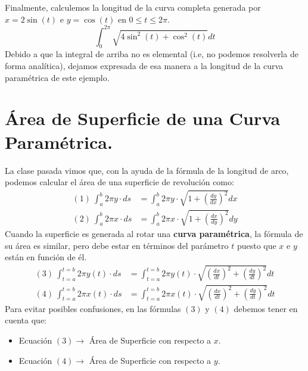 \documentclass[12pt]{article}
\begin{document}
Finalmente, calculemos la longitud de la curva completa generada por $x = 2 \sin(t)$ e $y = \cos(t)$ en $0 \leq t \leq 2\pi$.
\[
  \int_{0}^{2\pi} \sqrt{4\sin^{2}(t) + \cos^{2}(t)} dt
\]
Debido a que la integral de arriba no es elemental (i.e, no podemos resolverla de forma analítica), dejamos expresada de esa manera a la longitud de la curva paramétrica de este ejemplo.


\section{Área de Superficie de una Curva Paramétrica.}

La clase pasada vimos que, con la ayuda de la fórmula de la longitud de arco, podemos calcular el área de una superficie de revolución como:
\begin{align*}
  (1) \ \int_{a}^{b} 2 \pi y \cdot ds &= \int_{a}^{b} 2 \pi y \cdot \sqrt{1 + \left(\frac{dy}{dx}\right)^{2}} dx \\
  (2) \ \int_{a}^{b} 2 \pi x \cdot ds &= \int_{a}^{b} 2 \pi x \cdot \sqrt{1 + \left(\frac{dx}{dy}\right)^{2}} dy
\end{align*}
Cuando la superficie es generada al rotar una \textbf{curva paramétrica}, la fórmula de su área es similar, pero debe estar en términos del parámetro $t$ puesto que $x$ e $y$ están en función de él.
\begin{align*}
  (3) \ \int_{t = a}^{t = b} 2 \pi y(t) \cdot ds &=
    \int_{t = a}^{t = b} 2 \pi y(t) \cdot \sqrt{\left(\frac{dx}{dt}\right)^{2} + \left(\frac{dy}{dt}\right)^{2}} dt \\
  (4) \ \int_{t = a}^{t = b} 2 \pi x(t) \cdot ds &=
    \int_{t = a}^{t = b} 2 \pi x(t) \cdot \sqrt{\left(\frac{dx}{dt}\right)^{2} + \left(\frac{dy}{dt}\right)^{2}} dt
\end{align*}
Para evitar posibles confusiones, en las fórmulas $(3)$ y $(4)$ debemos tener en cuenta que:

\begin{itemize}
\item Ecuación $(3) \rightarrow$ Área de Superficie con respecto a $x$.
\item Ecuación $(4) \rightarrow$ Área de Superficie con respecto a $y$.
\end{itemize}
\end{document}
